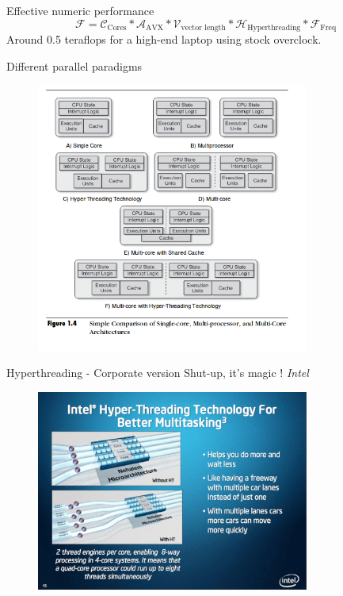 \begin{frame}{Effective numeric performance}
    $$
    \mathcal{F} = \mathcal{C}_{\text{Cores}} * \mathcal{A}_{\text{AVX}} * \mathcal{V}_{\text{vector length}} * \mathcal{H}_{\text{Hyperthreading}} *\mathcal{F}_{\text{Freq}}
    $$
    Around 0.5 teraflops for a high-end laptop using stock overclock.
\end{frame}


\begin{frame}{Different parallel paradigms}
    \begin{figure}
        \centering
        \includegraphics[width=0.8\textwidth]{png/hyperthread.png}
    \end{figure}
\end{frame}


\begin{frame}{Hyperthreading - Corporate version}
    Shut-up, it's magic ! \emph{Intel}
    \begin{figure}
        \centering
        \includegraphics[width=0.8\textwidth]{png/intel_hyperthread.png}
    \end{figure}
\end{frame}

